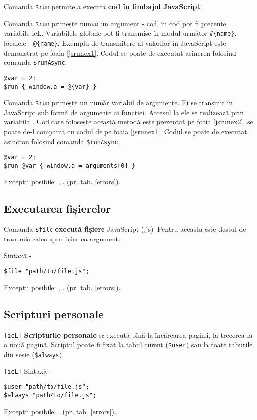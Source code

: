 Comanda \lstinline|$run| permite a executa {\bf cod în limbajul JavaScript}.

\code{[icL]} Comanda \lstinline|$run| primește numai un argument - cod, în cod pot fi prezente variabile icL. Variabilele globale pot fi transmise în modul următor \lstinline|#{name}|, localele - \lstinline|@{name}|. Exemplu de transmitere al valorilor în JavaScript este demonstrat pe foaia \ref{jsrunex1}. Codul se poate de executat asincron folosind comanda \lstinline|$runAsync|.

\begin{lstlisting}[caption=Executarea codului în limbajul JavaScript (icL), label=jsrunex1]
@var = 2;
$run { window.a = @{var} }
\end{lstlisting}

\code{[w3c]} Comanda \lstinline|$run| primește un număr variabil de argumente. Ei se transmit în JavaScript sub formă de argumente ai funcției. Accesul la ele se realizează prin variabila . Cod care folosește această metodă este prezentat pe foaia \ref{jsrunex2}, se poate de-l comparat cu codul de pe foaia \ref{jsrunex1}. Codul se poate de executat asincron folosind comanda \lstinline|$runAsync|.

\begin{lstlisting}[caption=Executarea codului în limbajul JavaScript (w3c), label=jsrunex2]
@var = 2;
$run @var { window.a = arguments[0] }
\end{lstlisting}

Excepții posibile: , . (pr. tab. \ref{errors}).

\subsection{Executarea fișierelor}

Comanda \lstinline|$file| {\bf execută fișiere} JavaScript (.js). Pentru aceasta este destul de transmis calea spre fișier ca argument.

Sintaxă -
\begin{lstlisting}[numbers=none]
$file "path/to/file.js";
\end{lstlisting}

Excepții posibile: , . (pr. tab. \ref{errors}).

\subsection{Scripturi personale}

\lstinline|[icL]| {\bf Scripturile personale} se execută pînă la încărcarea paginii, la trecerea la o nouă pagină. Scriptul poate fi fixat la tabul curent (\lstinline|$user|) sau la toate taburile din sesie (\lstinline|$always|).

\lstinline|[icL]| Sintaxă -
\begin{lstlisting}[numbers=none]
$user "path/to/file.js";
$always "path/to/file.js";
\end{lstlisting}

Excepții posibile: . (pr. tab. \ref{errors}).

